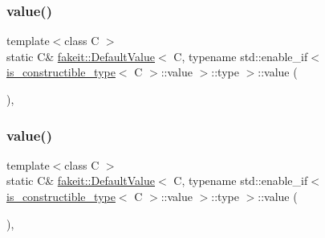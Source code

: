 \subsubsection{\texorpdfstring{value()}{value()}\hspace{0.1cm}{\footnotesize\ttfamily [2/9]}}
{\footnotesize\ttfamily template$<$class C $>$ \\
static C\& \mbox{\hyperlink{structfakeit_1_1DefaultValue}{fakeit\+::\+Default\+Value}}$<$ C, typename std\+::enable\+\_\+if$<$ \mbox{\hyperlink{structfakeit_1_1is__constructible__type}{is\+\_\+constructible\+\_\+type}}$<$ C $>$\+::value $>$\+::type $>$\+::value (\begin{DoxyParamCaption}{ }\end{DoxyParamCaption})\hspace{0.3cm}{\ttfamily [inline]}, {\ttfamily [static]}}

\mbox{\label{structfakeit_1_1DefaultValue_3_01C_00_01typename_01std_1_1enable__if_3_01is__constructible__typeba4172eb6f54b4f010948e5b77fe8b8f_ae142b421f47b7029f531c0a996e876e7}} 
\subsubsection{\texorpdfstring{value()}{value()}\hspace{0.1cm}{\footnotesize\ttfamily [3/9]}}
{\footnotesize\ttfamily template$<$class C $>$ \\
static C\& \mbox{\hyperlink{structfakeit_1_1DefaultValue}{fakeit\+::\+Default\+Value}}$<$ C, typename std\+::enable\+\_\+if$<$ \mbox{\hyperlink{structfakeit_1_1is__constructible__type}{is\+\_\+constructible\+\_\+type}}$<$ C $>$\+::value $>$\+::type $>$\+::value (\begin{DoxyParamCaption}{ }\end{DoxyParamCaption})\hspace{0.3cm}{\ttfamily [inline]}, {\ttfamily [static]}}

